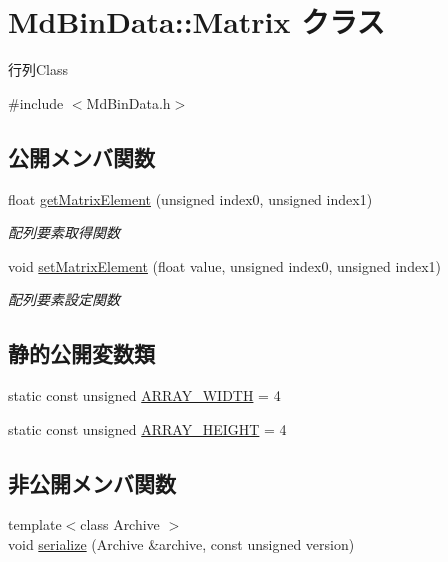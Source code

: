 \hypertarget{class_md_bin_data_1_1_matrix}{}\section{Md\+Bin\+Data\+:\+:Matrix クラス}
\label{class_md_bin_data_1_1_matrix}


行列\+Class  




{\ttfamily \#include $<$Md\+Bin\+Data.\+h$>$}

\subsection*{公開メンバ関数}
\begin{DoxyCompactItemize}
\item 
float \mbox{\hyperlink{class_md_bin_data_1_1_matrix_a18fdeb0e8152f5f8a8ba8e8d64c925bf}{get\+Matrix\+Element}} (unsigned index0, unsigned index1)
\begin{DoxyCompactList}\small\item\em 配列要素取得関数 \end{DoxyCompactList}\item 
void \mbox{\hyperlink{class_md_bin_data_1_1_matrix_a0e5ff333aec5c3c27fb5b0d14e085b91}{set\+Matrix\+Element}} (float value, unsigned index0, unsigned index1)
\begin{DoxyCompactList}\small\item\em 配列要素設定関数 \end{DoxyCompactList}\end{DoxyCompactItemize}
\subsection*{静的公開変数類}
\begin{DoxyCompactItemize}
\item 
static const unsigned \mbox{\hyperlink{class_md_bin_data_1_1_matrix_adbf2f2e21df64ab4559b9c98b88a6c59}{A\+R\+R\+A\+Y\+\_\+\+W\+I\+D\+TH}} = 4
\item 
static const unsigned \mbox{\hyperlink{class_md_bin_data_1_1_matrix_a69ea4171a8c2fbf1728396463bfd9bc8}{A\+R\+R\+A\+Y\+\_\+\+H\+E\+I\+G\+HT}} = 4
\end{DoxyCompactItemize}
\subsection*{非公開メンバ関数}
\begin{DoxyCompactItemize}
\item 
{\footnotesize template$<$class Archive $>$ }\\void \mbox{\hyperlink{class_md_bin_data_1_1_matrix_a8494155c326062f5a4c7e2352b7c577d}{serialize}} (Archive \&archive, const unsigned version)
\end{DoxyCompactItemize}
